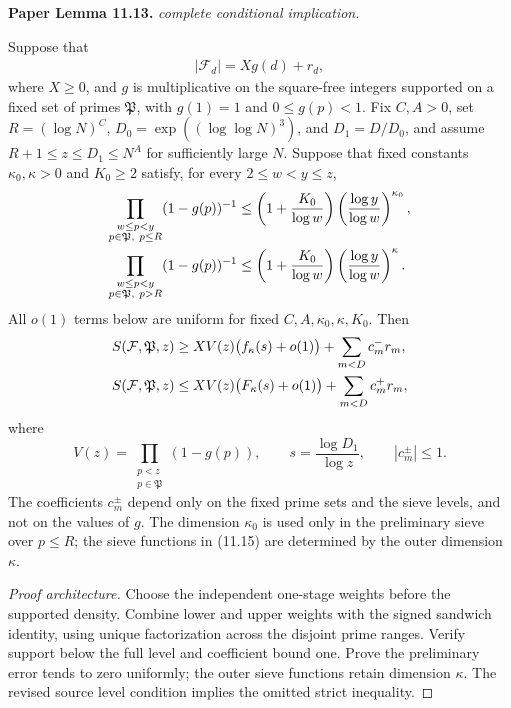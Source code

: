 \begin{lemma}
\label{two_range_presieve}
\leanok
\par\medskip\noindent\textbf{Paper Lemma 11.13.} \textit{complete conditional implication.}\par
Suppose that
\begin{align}
 |\mathcal F_d|=Xg(d)+r_d,
\end{align}
where \(X\geq0\), and \(g\) is multiplicative on the square-free
integers supported on a fixed set of primes \(\mathfrak P\),
with \(g(1)=1\) and \(0\leq g(p)<1\).
Fix \(C,A>0\), set \(R=(\log N)^C\),
\(D_0=\exp((\log\log N)^3)\), and \(D_1=D/D_0\), and assume
\(R+1\leq z\leq D_1\leq N^A\) for sufficiently large \(N\).
Suppose that fixed constants \(\kappa_0,\kappa>0\) and
\(K_0\geq2\) satisfy, for every \(2\leq w<y\leq z\),
\begin{align}
 \prod_{\substack{w\leq p<y\\p\in\mathfrak P,\ p\leq R}}
 (1-g(p))^{-1}
 &\leq
 \left(1+\frac{K_0}{\log w}\right)
 \left(\frac{\log y}{\log w}\right)^{\kappa_0},\notag\\
 \prod_{\substack{w\leq p<y\\p\in\mathfrak P,\ p>R}}
 (1-g(p))^{-1}
 &\leq
 \left(1+\frac{K_0}{\log w}\right)
 \left(\frac{\log y}{\log w}\right)^\kappa.
\end{align}
All \(o(1)\) terms below are uniform for fixed
\(C,A,\kappa_0,\kappa,K_0\).
Then
\begin{align}
 S(\mathcal F,\mathfrak P,z)
 &\geq XV(z)\bigl(f_\kappa(s)+o(1)\bigr)
 +\sum_{m<D}c_m^-r_m,\notag\\
 S(\mathcal F,\mathfrak P,z)
 &\leq XV(z)\bigl(F_\kappa(s)+o(1)\bigr)
 +\sum_{m<D}c_m^+r_m,
\end{align}
where
\[
 V(z)=\prod_{\substack{p<z\\p\in\mathfrak P}}(1-g(p)),
 \qquad
 s=\frac{\log D_1}{\log z},
 \qquad
 |c_m^\pm|\leq1.
\]
The coefficients \(c_m^\pm\) depend only on the fixed prime sets and
the sieve levels, and not on the values of \(g\).  
The dimension
\(\kappa_0\) is used only in the preliminary sieve over \(p\leq R\);
the sieve functions in \textup{(11.15)} are determined by
the outer dimension \(\kappa\).
\end{lemma}
\begin{proof}[Proof architecture]
\leanok
Choose the independent one-stage weights before the supported density. Combine lower and upper weights with the signed sandwich identity, using unique factorization across the disjoint prime ranges. Verify support below the full level and coefficient bound one. Prove the preliminary error tends to zero uniformly; the outer sieve functions retain dimension $\kappa$. The revised source level condition implies the omitted strict inequality.
\end{proof}

